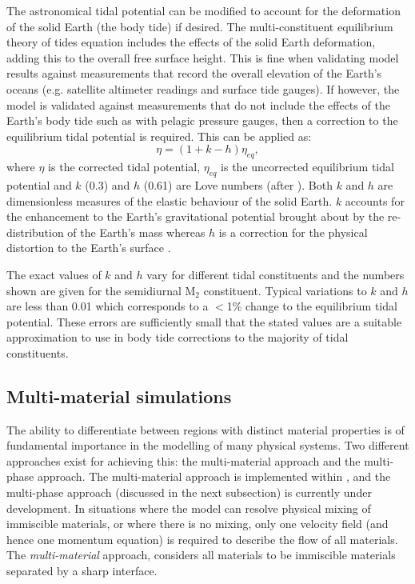 The astronomical tidal potential can be modified to account for the deformation of the solid Earth
(the body tide) if desired. The multi-constituent equilibrium theory of tides equation includes the effects of the
solid Earth deformation, adding this to the overall free surface height. 
This is fine
when validating model results against measurements that record the overall elevation of the 
Earth's oceans (e.g. satellite altimeter readings and surface tide gauges). If however, the model
is validated against measurements that do not include the effects of the Earth's body tide
such as with pelagic pressure gauges, then a correction to the equilibrium tidal potential
is required. This can be applied as: 
\begin{equation}
\eta=(1+k-h)\eta_{eq},
\label{eq:body-tide}
\end{equation}    
where $\eta$ is the corrected tidal potential, $\eta_{eq}$ is the uncorrected equilibrium tidal potential
and $k$ (0.3) and $h$ (0.61) are Love numbers (after \citealp{Love1909}).
Both $k$ and $h$ are dimensionless measures of the elastic behaviour of the solid Earth. $k$ accounts for the enhancement to the
Earth's gravitational potential brought about by the re-distribution of the Earth's mass whereas $h$
is a correction for the physical distortion to the Earth's surface \citep{Pugh1987}.

The exact values of $k$ and $h$ vary for different tidal constituents and the numbers shown are given
for the semidiurnal M$_{\text{2}}$ constituent. Typical variations to $k$ and $h$ are less than 0.01 which
corresponds to a $<$1\% change to the equilibrium tidal potential.
These errors are sufficiently small that the stated values are a suitable approximation to
use in body tide corrections to the majority of tidal constituents.

\subsection{Multi-material simulations}
The ability to differentiate between regions with distinct material properties is of fundamental importance in the modelling of many physical systems. Two different approaches exist for achieving this: the multi-material approach and the multi-phase approach. The multi-material approach is implemented within \fluidity, and the multi-phase approach (discussed in the next subsection) is currently under development.
In situations where the model can resolve physical mixing of immiscible materials, or where there is no mixing, only one velocity field (and hence one momentum equation) is required to describe the flow of all materials. The \emph{multi-material} approach, considers all materials to be immiscible materials separated by a sharp interface.

